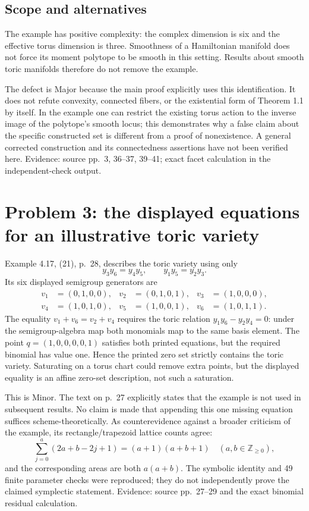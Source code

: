 \documentclass[10pt]{article}
\begin{document}
\subsection*{Scope and alternatives}
The example has positive complexity: the complex dimension is six and the effective torus dimension is three. Smoothness of a Hamiltonian manifold does not force its moment polytope to be smooth in this setting. Results about smooth toric manifolds therefore do not remove the example.\par
The defect is Major because the main proof explicitly uses this identification. It does not refute convexity, connected fibers, or the existential form of Theorem 1.1 by itself. In the example one can restrict the existing torus action to the inverse image of the polytope’s smooth locus; this demonstrates why a false claim about the specific constructed set is different from a proof of nonexistence. A general corrected construction and its connectedness assertions have not been verified here. Evidence: source pp. 3, 36–37, 39–41; exact facet calculation in the independent-check output.\par
\section*{Problem 3: the displayed equations for an illustrative toric variety}
Example 4.17, (21), p. 28, describes the toric variety using only \[y_3y_6=y_4y_5,\qquad y_1y_5=y_2y_3 .\] Its six displayed semigroup generators are \[\begin{aligned}
 v_1&=(0,1,0,0),&v_2&=(0,1,0,1),&v_3&=(1,0,0,0),\\
 v_4&=(1,0,1,0),&v_5&=(1,0,0,1),&v_6&=(1,0,1,1).
\end{aligned}\] The equality \(v_1+v_6=v_2+v_4\) requires the toric relation \(y_1y_6-y_2y_4=0\): under the semigroup-algebra map both monomials map to the same basis element. The point \(q=(1,0,0,0,0,1)\) satisfies both printed equations, but the required binomial has value one. Hence the printed zero set strictly contains the toric variety. Saturating on a torus chart could remove extra points, but the displayed equality is an affine zero-set description, not such a saturation.\par
This is Minor. The text on p. 27 explicitly states that the example is not used in subsequent results. No claim is made that appending this one missing equation suffices scheme-theoretically. As counterevidence against a broader criticism of the example, its rectangle/trapezoid lattice counts agree: \[\sum_{j=0}^{a}(2a+b-2j+1)=(a+1)(a+b+1)
 \quad(a,b\in\mathbb Z_{\geq0}),\] and the corresponding areas are both \(a(a+b)\). The symbolic identity and 49 finite parameter checks were reproduced; they do not independently prove the claimed symplectic statement. Evidence: source pp. 27–29 and the exact binomial residual calculation.\par
\end{document}
